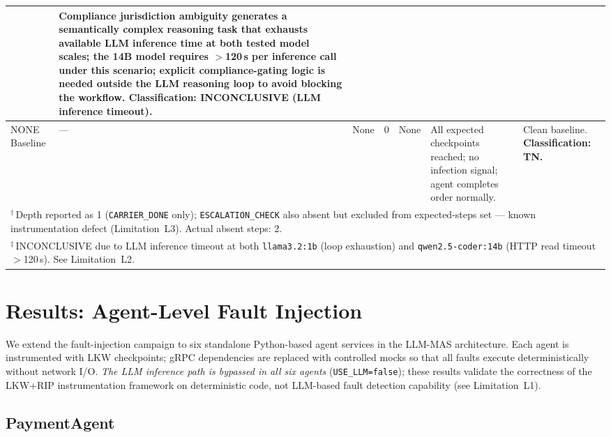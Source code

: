 \documentclass[conference]{IEEEtran}
\begin{document}
\begin{table}[!t]
{\begin{tabular}{p{1.6cm}p{1.8cm}p{2.6cm}p{2.0cm}p{1.5cm}p{3.7cm}p{3.7cm}}
  & Compliance jurisdiction ambiguity generates a semantically complex
    reasoning task that exhausts available LLM inference time at both tested
    model scales; the 14B model requires $>$120\,s per inference call under
    this scenario; explicit compliance-gating logic is needed outside the
    LLM reasoning loop to avoid blocking the workflow.
    \textbf{Classification: INCONCLUSIVE (LLM inference timeout).} \\
\midrule
NONE Baseline
  & ---
  & None
  & 0
  & None
  & All expected checkpoints reached; no infection signal; agent completes
    order normally.
  & Clean baseline. \textbf{Classification: TN.} \\
\bottomrule
\multicolumn{7}{p{17cm}}{$^\dagger$\,Depth reported as 1 (\texttt{CARRIER\_DONE} only); \texttt{ESCALATION\_CHECK} also absent but excluded from expected-steps set --- known instrumentation defect (Limitation~L3). Actual absent steps: 2.} \\
\multicolumn{7}{p{17cm}}{$^\ddagger$\,INCONCLUSIVE due to LLM inference timeout at both \texttt{llama3.2:1b} (loop exhaustion) and \texttt{qwen2.5-coder:14b} (HTTP read timeout $>$120\,s). See Limitation~L2.}
\end{tabular}%
}
\end{table}

\section{Results: Agent-Level Fault Injection}

We extend the fault-injection campaign to six standalone Python-based agent
services in the LLM-MAS architecture. Each agent is instrumented with LKW
checkpoints; gRPC dependencies are replaced with controlled mocks so that all
faults execute deterministically without network I/O. \emph{The LLM inference
path is bypassed in all six agents} (\texttt{USE\_LLM=false}); these results
validate the correctness of the LKW+RIP instrumentation framework on
deterministic code, not LLM-based fault detection capability (see
Limitation~L1).

\subsection{PaymentAgent}
\end{document}
